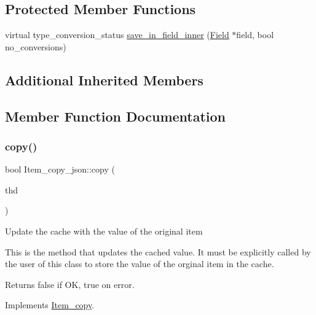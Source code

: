 \subsection*{Protected Member Functions}
\begin{DoxyCompactItemize}
\item 
virtual type\+\_\+conversion\+\_\+status \mbox{\hyperlink{classItem__copy__json_a30b375a69d8ab08efa641fc376490804}{save\+\_\+in\+\_\+field\+\_\+inner}} (\mbox{\hyperlink{classField}{Field}} $\ast$field, bool no\+\_\+conversions)
\end{DoxyCompactItemize}
\subsection*{Additional Inherited Members}


\subsection{Member Function Documentation}
\mbox{\label{classItem__copy__json_a061528b6d05583ba76ecec780d4603f7}} 
\subsubsection{\texorpdfstring{copy()}{copy()}}
{\footnotesize\ttfamily bool Item\+\_\+copy\+\_\+json\+::copy (\begin{DoxyParamCaption}\item[{const T\+HD $\ast$}]{thd }\end{DoxyParamCaption})\hspace{0.3cm}{\ttfamily [virtual]}}

Update the cache with the value of the original item

This is the method that updates the cached value. It must be explicitly called by the user of this class to store the value of the orginal item in the cache. \begin{DoxyReturn}{Returns}
false if OK, true on error. 
\end{DoxyReturn}


Implements \mbox{\hyperlink{classItem__copy_a575caec22eeb27fb76d5aa74b1a8d492}{Item\+\_\+copy}}.

\mbox{\label{classItem__copy__json_a30b375a69d8ab08efa641fc376490804}} 

